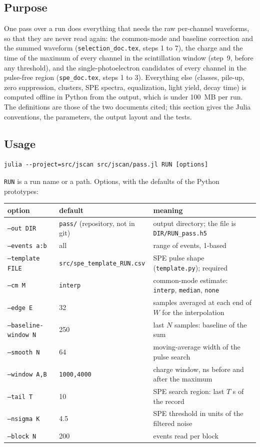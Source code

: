 \documentclass[11pt]{article}
\newcommand{\code}[1]{\texttt{#1}}
\newcommand{\us}{\textmu s}
\begin{document}
\subsection{Purpose}

One pass over a run does everything that needs the raw per-channel
waveforms, so that they are never read again: the common-mode and baseline
correction and the summed waveform (\code{selection\_doc.tex}, steps 1 to
7), the charge and the time of the maximum of every channel in the
scintillation window (step~9, before any threshold), and the
single-photoelectron candidates of every channel in the pulse-free region
(\code{spe\_doc.tex}, steps 1 to 3). Everything else (classes, pile-up, zero
suppression, clusters, SPE spectra, equalization, light yield, decay time)
is computed offline in Python from the output, which is under 100~MB per
run. The definitions are those of the two documents cited; this section
gives the Julia conventions, the parameters, the output layout and the
tests.

\subsection{Usage}

\begin{lstlisting}
julia --project=src/jscan src/jscan/pass.jl RUN [options]
\end{lstlisting}

\code{RUN} is a run name or a path. Options, with the defaults of the
Python prototypes:

\begin{center}
\begin{tabular}{l l p{70mm}}
\toprule
option & default & meaning \\
\midrule
\code{--out DIR} & \code{pass/} (repository, not in git) & output directory; the file is \code{DIR/RUN\_pass.h5} \\
\code{--events a:b} & all & range of events, 1-based \\
\code{--template FILE} & \code{src/spe\_template\_RUN.csv} & SPE pulse shape (\code{template.py}); required \\
\code{--cm M} & \code{interp} & common-mode estimate: \code{interp}, \code{median}, \code{none} \\
\code{--edge E} & 32 & samples averaged at each end of $W$ for the interpolation \\
\code{--baseline-window N} & 250 & last $N$ samples: baseline of the sum \\
\code{--smooth N} & 64 & moving-average width of the pulse search \\
\code{--window A,B} & \code{1000,4000} & charge window, ns before and after the maximum \\
\code{--tail T} & 10 & SPE search region: last $T$ \us{} of the record \\
\code{--nsigma K} & 4.5 & SPE threshold in units of the filtered noise \\
\code{--block N} & 200 & events read per block \\
\bottomrule
\end{tabular}
\end{center}
\end{document}

